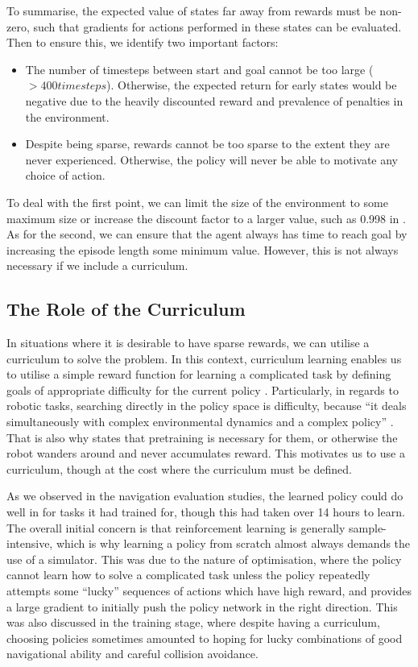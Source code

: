To summarise, the expected value of states far away from rewards must be non-zero, such that gradients for actions performed in these states can be evaluated. Then to ensure this, we identify two important factors:
\begin{itemize}
    \item The number of timesteps between start and goal cannot be too large ($>400 timesteps$). Otherwise, the expected return for early states would be negative due to the heavily discounted reward and prevalence of penalties in the environment.
    \item Despite being sparse, rewards cannot be too sparse to the extent they are never experienced. Otherwise, the policy will never be able to motivate any choice of action.
\end{itemize}
To deal with the first point, we can limit the size of the environment to some maximum size or increase the discount factor to a larger value, such as 0.998 in \cite{AMPMotionPriors}.
As for the second, we can ensure that the agent always has time to reach goal by increasing the episode length some minimum value. However, this is not always necessary if we include a curriculum.


\subsection{The Role of the Curriculum}
In situations where it is desirable to have sparse rewards, we can utilise a curriculum to solve the problem. In this context, curriculum learning enables us to utilise a simple reward function for learning a complicated task by defining goals of appropriate difficulty for the current policy \cite{sparseRewards_autoGoalGeneration}. Particularly, in regards to robotic tasks, searching directly in the policy space is difficulty, because ``it deals simultaneously with complex environmental dynamics and a complex policy'' \cite{DDPG}. That is also why \cite{MotionPlanningAmongDynamicAgentsDRL2018} states that pretraining is necessary for them, or otherwise the robot wanders around and never accumulates reward. This motivates us to use a curriculum, though at the cost where the curriculum must be defined.

As we observed in the navigation evaluation studies, the learned policy could do well in for tasks it had trained for, though this had taken over 14 hours to learn. The overall initial concern is that reinforcement learning is generally sample-intensive, which is why learning a policy from scratch almost always demands the use of a simulator. This was due to the nature of optimisation, where the policy cannot learn how to solve a complicated task unless the policy repeatedly attempts some ``lucky'' sequences of actions which have high reward, and provides a large gradient to initially push the policy network in the right direction. This was also discussed in the training stage, where despite having a curriculum, choosing policies sometimes amounted to hoping for lucky combinations of good navigational ability and careful collision avoidance. 

